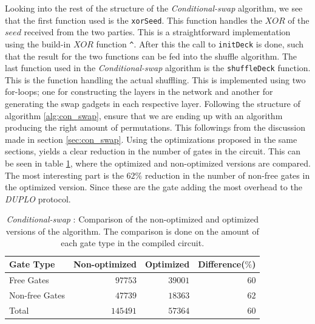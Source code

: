 \documentclass[twoside,11pt,openright]{report}
\newcommand{\CS}{\textit{Conditional-swap} }
\newcommand{\DUPLO}{\textit{DUPLO} }
\begin{document}
Looking into the rest of the structure of the \CS algorithm, we see that the first function used is the \verb|xorSeed|. This function handles the $XOR$ of the $seed$ received from the two parties. This is a straightforward implementation using the build-in $XOR$ function \verb|^|. After this the call to \verb|initDeck| is done, such that the result for the two functions can be fed into the shuffle algorithm. The last function used in the \CS algorithm is the \verb|shuffleDeck| function. This is the function handling the actual shuffling. This is implemented using two for-loops; one for constructing the layers in the network and another for generating the swap gadgets in each respective layer. Following the structure of algorithm \ref{alg:con_swap}, ensure that we are ending up with an algorithm producing the right amount of permutations. This followings from the discussion made in section \ref{sec:con_swap}. Using the optimizations proposed in the same sections, yields a clear reduction in the number of gates in the circuit. This can be seen in table \ref{table:con_swap_comp}, where the optimized and non-optimized versions are compared. The most interesting part is the $62\%$ reduction in the number of non-free gates in the optimized version. Since these are the gate adding the most overhead to the \DUPLO protocol.

\begin{table}[t]
\centering
\begin{tabular}{l || r r r}
Gate Type      & Non-optimized  & Optimized & Difference($\%$)    \\
\hline
Free Gates     &  $97753$       & $39001$   & $60$ \\
Non-free Gates &  $47739$       & $18363$   & $62$ \\
\hline
Total          & $145491$       & $57364$   & $60$
\end{tabular}
\caption{\CS: Comparison of the non-optimized and optimized versions of the algorithm. The comparison is done on the amount of each gate type in the compiled circuit.}
\label{table:con_swap_comp}
\end{table}
\end{document}
